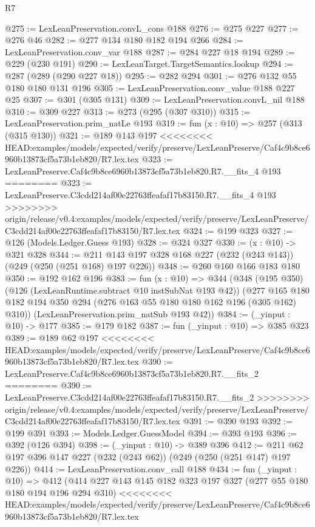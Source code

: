 \begin{lexlean}{R7}
\begin{coremodule}
{{{{{{{{{{{{{@275 := LexLeanPreservation.convL_cons @188
@276 := @275 @227
@277 := @276 @46
@282 := @277 @134 @180 @182 @194 @266
@284 := LexLeanPreservation.conv_var @188
@287 := @284 @227 @18 @194
@289 := @229 (@230 @191)
@290 := LexLeanTarget.TargetSemantics.lookup
@294 := @287 (@289 (@290 @227 @18))
@295 := @282 @294
@301 := @276 @132 @55 @180 @180 @131 @196
@305 := LexLeanPreservation.conv_value @188 @227 @25
@307 := @301 (@305 @131)
@309 := LexLeanPreservation.convL_nil @188
@310 := @309 @227
@313 := @273 (@295 (@307 @310))
@315 := LexLeanPreservation.prim_natLe @193
@319 := fun (x : @10) => @257 (@313 (@315 @130))
@321 := @189 @143 @197
<<<<<<<< HEAD:examples/models/expected/verify/preserve/LexLeanPreserve/Caf4c9b8ce6960b13873cf5a73b1eb820/R7.lex.tex
@323 := LexLeanPreserve.Caf4c9b8ce6960b13873cf5a73b1eb820.R7.__fits_4 @193
========
@323 := LexLeanPreserve.C3cdd214af00e22763ffeafaf17b83150.R7.__fits_4 @193
>>>>>>>> origin/release/v0.4:examples/models/expected/verify/preserve/LexLeanPreserve/C3cdd214af00e22763ffeafaf17b83150/R7.lex.tex
@324 := @199 @323
@327 := @126 (Models.Ledger.Guess @193)
@328 := @324 @327
@330 := (x : @10) -> @321 @328
@344 := @211 @143 @197 @328 @168 @227 (@232 (@243 @143)) (@249 (@250 (@251 @168) @197 @226))
@348 := @260 @160 @166 @183 @180
@350 := @192 @162 @196
@383 := fun (x : @10) =>
  @344
    (@348
      (@195 @350)
      (@126 (LexLeanRuntime.subtract @10 instSubNat @193 @42))
      (@277 @165 @180 @182 @194 @350 @294 (@276 @163 @55 @180 @180 @162 @196 (@305 @162) @310))
      (LexLeanPreservation.prim_natSub @193 @42))
@384 := (_yinput : @10) -> @177
@385 := @179 @182
@387 := fun (_yinput : @10) => @385 @323
@389 := @189 @62 @197
<<<<<<<< HEAD:examples/models/expected/verify/preserve/LexLeanPreserve/Caf4c9b8ce6960b13873cf5a73b1eb820/R7.lex.tex
@390 := LexLeanPreserve.Caf4c9b8ce6960b13873cf5a73b1eb820.R7.__fits_2
========
@390 := LexLeanPreserve.C3cdd214af00e22763ffeafaf17b83150.R7.__fits_2
>>>>>>>> origin/release/v0.4:examples/models/expected/verify/preserve/LexLeanPreserve/C3cdd214af00e22763ffeafaf17b83150/R7.lex.tex
@391 := @390 @193
@392 := @199 @391
@393 := Models.Ledger.GuessModel
@394 := @393 @193
@396 := @392 (@126 @394)
@398 := (_yinput : @10) -> @389 @396
@412 := @211 @62 @197 @396 @147 @227 (@232 (@243 @62)) (@249 (@250 (@251 @147) @197 @226))
@414 := LexLeanPreservation.conv_call @188
@434 := fun (_yinput : @10) =>
  @412
    (@414
      @227
      @143
      @145
      @182
      @323
      @197
      @327
      (@277 @55 @180 @180 @194 @196 @294 @310)
<<<<<<<< HEAD:examples/models/expected/verify/preserve/LexLeanPreserve/Caf4c9b8ce6960b13873cf5a73b1eb820/R7.lex.tex
}}}}}}}}}}}}}
\end{coremodule}
\end{lexlean}

